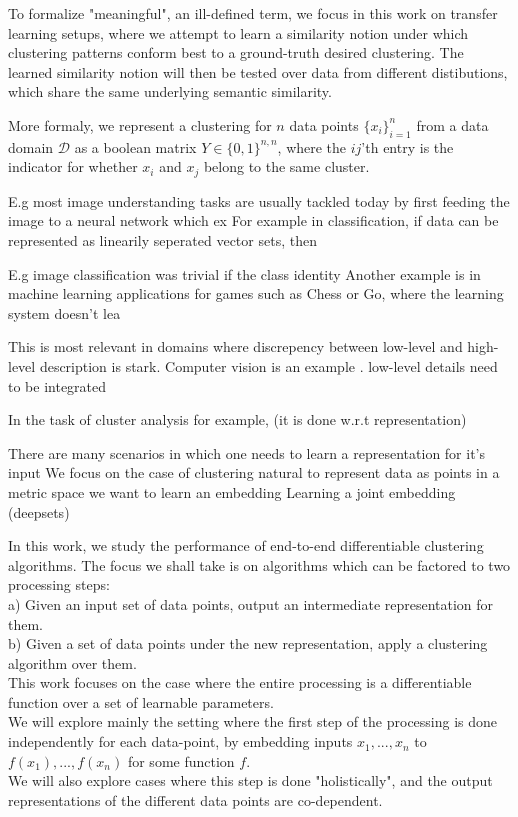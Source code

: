 To formalize "meaningful", an ill-defined term, we focus in this work on transfer learning setups, where we attempt to learn a similarity notion under which clustering patterns conform best to a ground-truth desired clustering. The learned similarity notion will then be tested over data from different distibutions, which share the same underlying semantic similarity.  

More formaly, we represent a clustering for $n$ data points $\{x_i\}_{i=1}^{n}$ from a data domain $\mathcal{D}$ as a boolean matrix $Y\in\{0,1\}^{n,n}$, where the $ij$'th entry is the indicator for whether $x_i$ and $x_j$ belong to the same cluster. 


E.g most image understanding tasks are usually tackled today by first feeding the image to a neural network which ex  
For example in classification, if data can be represented as linearily seperated vector sets, then  

E.g image classification was trivial if the class identity  
Another example is in machine learning applications for games such as Chess or Go, where the learning system doesn't lea 


This is most relevant in domains where discrepency between low-level and high-level description is stark.
Computer vision is an example . low-level details need to be integrated 

In the task of cluster analysis for example, (it is done w.r.t representation)

There are many scenarios in which one needs to learn a representation for it's input
We focus on the case of clustering
natural to represent data as points in a metric space
we want to learn an embedding
Learning a joint embedding (deepsets)



\iffalse
In this work, we study the performance of end-to-end differentiable clustering algorithms.
The focus we shall take is on algorithms which can be factored to two processing steps:\\
a) Given an input set of data points, output an intermediate representation for them.\\
b) Given a set of data points under the new representation, apply a clustering algorithm over them.\\
This work focuses on the case where the entire processing is a differentiable function over a set of learnable parameters.\\
We will explore mainly the setting where the first step of the processing is done independently for each data-point, by embedding inputs $x_1,...,x_n$ to $f(x_1),...,f(x_n)$ for some function $f$.\\ We will also explore cases where this step is done "holistically", and the output representations of the different data points are co-dependent. \\  


